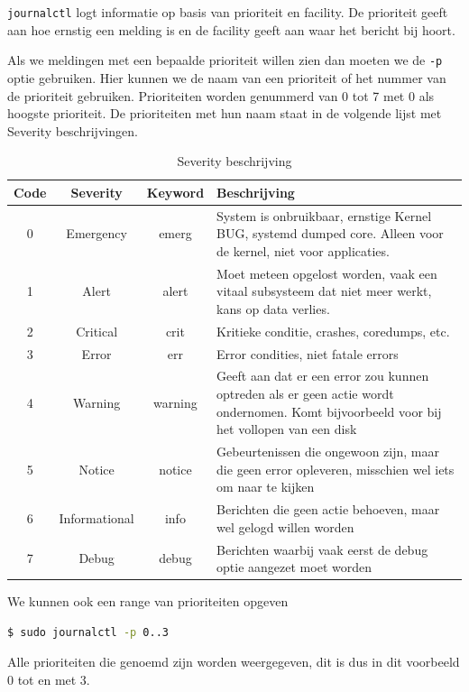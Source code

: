 \texttt{journalctl} logt informatie op basis van prioriteit en facility. De prioriteit geeft aan hoe ernstig een melding is en de facility geeft aan waar het bericht bij hoort.

Als we meldingen met een bepaalde prioriteit willen zien dan moeten we de \texttt{-p} optie gebruiken. Hier kunnen we de naam van een prioriteit of het nummer van de prioriteit gebruiken. Prioriteiten worden genummerd van 0 tot 7 met 0 als hoogste prioriteit. De prioriteiten met hun naam staat in de volgende lijst met Severity beschrijvingen.

\begin{flushleft}
\begin{table}[h!]
\centering
\begin{tabularx}{\textwidth}{ |c|c|c|X| }
\hline
Code  & Severity & Keyword & Beschrijving \\
\hline
0 & Emergency & emerg & System is onbruikbaar, ernstige Kernel BUG, systemd dumped core. Alleen voor de kernel, niet voor applicaties. \\
\hline
1 & Alert & alert & Moet meteen opgelost worden, vaak een vitaal subsysteem dat niet meer werkt, kans op data verlies. \\
\hline
2 & Critical & crit & Kritieke conditie, crashes, coredumps, etc. \\
\hline
3 & Error & err & Error condities, niet fatale errors \\
\hline
4 & Warning & warning & Geeft aan dat er een error zou kunnen optreden als er geen actie wordt ondernomen. Komt bijvoorbeeld voor bij het vollopen van een disk \\
\hline
5 & Notice & notice & Gebeurtenissen die ongewoon zijn, maar die geen error opleveren, misschien wel iets om naar te kijken \\
\hline
6 & Informational & info & Berichten die geen actie behoeven, maar wel gelogd willen worden \\
\hline
7 & Debug & debug & Berichten waarbij vaak eerst de debug optie aangezet moet worden \\
\hline
\end{tabularx}
\caption{Severity beschrijving}
\label{table:facility}
\end{table}
\end{flushleft}

We kunnen ook een range van prioriteiten opgeven
\begin{lstlisting}[language=bash]
$ sudo journalctl -p 0..3
\end{lstlisting}
Alle prioriteiten die genoemd zijn worden weergegeven, dit is dus in dit voorbeeld 0 tot en met 3.

